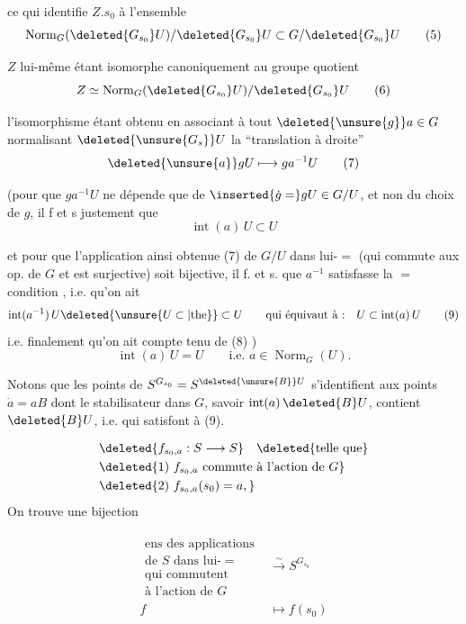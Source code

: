 ce qui identifie $Z.s_0$ à l'ensemble
\[
\operatorname{Norm}_G(\deleted{G_{s_0}}U)/\deleted{G_{s_0}}U\subset G/\deleted{G_{s_0}}U\tag*{(5)}
\]

$Z$ lui-même étant isomorphe canoniquement au groupe quotient
\[
Z\simeq\operatorname{Norm}_G(\deleted{G_{s_0}}U)/\deleted{G_{s_0}}U\tag*{(6)}
\]

l'isomorphisme étant obtenu en associant à tout $\deleted{\unsure{g}}a\in G$ normalisant $\deleted{\unsure{G_s}}U$ la ``translation à droite''
\[
\deleted{\unsure{a}}gU\longmapsto ga^{-1}U\tag*{(7)}
\]

(pour que $ga^{-1}U$ ne dépende que de $\inserted{\dot g=}gU\in G/U$, et non du choix de $g$, il f et s justement que   
\[
\operatorname{int}(a)\,U\subset U\tag*{(8)}
\]

et pour que l'application ainsi obtenue (7) de $G/U$ dans lui-$=$ (qui commute aux op. de $G$ et est surjective) soit bijective, il f. et s. que $a^{-1}$ satisfasse la $=$ condition , i.e. qu'on ait
\[
\operatorname{int}(a^{-1})\,U\deleted{\unsure{U\subset|\text{the}}} \subset U\qquad\text{qui équivaut à :}\quad U\subset\operatorname{int}(a)\,U \tag*{(9)}
\]
i.e. finalement qu'on ait compte tenu de (8) )
\[
\operatorname{int}(a)\,U=U\qquad\text{i.e. }a\in\operatorname{Norm}_G(U).\tag*{(10)}
\]

Notons que les points de $S^{G_{s_0}}=S^{\deleted{\unsure{B}}U}$ s'identifient aux points $\dot a=aB$  dont le stabilisateur dans $G$, savoir $\operatorname{int}(a)\,\deleted{B}U$, contient $\deleted{B}U$, i.e. qui satisfont à (9).

\[
\begin{aligned}
&\deleted{f_{s_0,a}:S\longrightarrow S}\quad\deleted{\text{telle que}}\\
&\deleted{\text{1) }f_{s_0,a}\text{ commute à l'action de }G}\\
&\deleted{\text{2) }f_{s_0,a}(s_0)=a,}
\end{aligned}
\]
On trouve une bijection  

\[
\begin{aligned}
\substack{\text{ens des applications}\\\text{de }S\text{ dans lui-} =\\\text{qui commutent}\\\text{à l'action de }G}&\xrightarrow{\sim}S^{G_{s_0}}\\
f&\longmapsto f(s_0)
\end{aligned}\tag*{(11)}
\]

